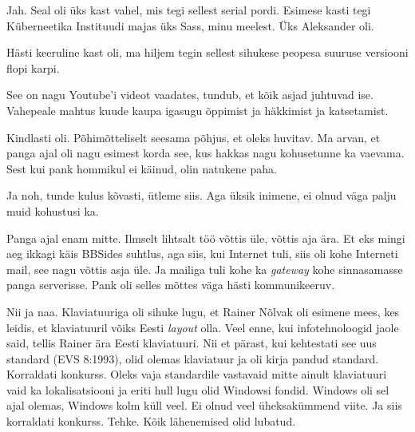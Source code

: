 Jah. Seal oli üks kast vahel, mis tegi sellest serial pordi. Esimese kasti tegi 
Küberneetika Instituudi majas üks Sass, minu 
meelest. Üks Aleksander oli.

Hästi keeruline kast oli, ma hiljem tegin  sellest sihukese peopesa suuruse 
versiooni flopi karpi.


See on nagu Youtube'i videot vaadates, tundub, et  kõik asjad juhtuvad ise. 
Vahepeale mahtus kuude kaupa igasugu õppimist ja häkkimist ja katsetamist.


Kindlasti oli. Põhimõtteliselt seesama põhjus, et oleks huvitav. Ma arvan, et 
panga ajal oli nagu esimest korda  see, kus hakkas nagu kohusetunne ka vaevama. 
Sest kui pank  hommikul ei käinud, olin natukene paha.

Ja noh, tunde kulus kõvasti, ütleme siis. Aga üksik inimene,  ei olnud  väga 
palju muid kohustusi ka.


Panga ajal enam mitte. Ilmselt lihtsalt töö võttis üle,  võttis aja ära. Et eks 
mingi aeg ikkagi käis BBSides suhtlus, aga siis, kui Internet tuli, siis oli 
kohe Interneti mail, see nagu võttis asja üle. Ja mailiga tuli kohe ka \emph{gateway} 
kohe sinnasamasse panga serverisse. Pank oli selles mõttes väga 
hästi kommunikeeruv.


Nii ja naa. Klaviatuuriga oli sihuke lugu, et Rainer Nõlvak oli esimene mees, kes leidis, et klaviatuuril võiks Eesti \emph{layout} 
olla. Veel enne, kui infotehnoloogid jaole said, tellis Rainer ära Eesti 
klaviatuuri. Nii et pärast, kui kehtestati see uus standard (EVS 8:1993),  
olid olemas klaviatuur ja oli kirja pandud standard. Korraldati 
konkurss. Oleks vaja standardile vastavaid mitte ainult klaviatuuri vaid 
ka lokalisatsiooni ja eriti hull lugu olid Windowsi fondid. 
Windows oli sel ajal olemas, Windows kolm küll veel. Ei olnud 
veel üheksakümmend viite. Ja siis korraldati konkurss. Tehke. Kõik lähenemised 
olid lubatud.

